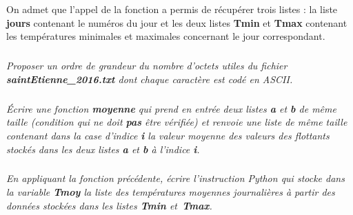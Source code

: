\documentclass[10pt,fleqn]{article} %
\begin{document}
%
%
%

On admet que l'appel de la fonction a permis de récupérer trois listes : la liste \textbf{jours}
contenant le numéros du jour et  les deux listes \textbf{Tmin} et 
\textbf{Tmax} contenant les températures minimales et maximales concernant le jour 
correspondant.


\subparagraph{} 
\textit{Proposer un ordre de grandeur du nombre d'octets utiles du fichier 
\textbf{saintEtienne\_2016.txt} dont chaque caractère est codé en ASCII.}

\ifprof
\begin{corrige}
\end{corrige}
\else
\fi
	
\subparagraph{} 
	\textit{Écrire une fonction \textbf{moyenne} qui prend en entrée deux listes 
	\textbf{a} et \textbf{b} de même taille (condition qui ne doit \textbf{pas} être vérifiée)
	 et renvoie une liste de même taille contenant dans 
	la case d'indice \textbf{i} la valeur moyenne des valeurs des flottants 
	stockés dans les deux listes \textbf{a} et \textbf{b} à l'indice \textbf{i}.}
	
\ifprof
\begin{corrige}
\end{corrige}
\else
\fi
	
\subparagraph{} 
\textit{En appliquant la fonction précédente, écrire l'instruction Python 
	qui stocke dans la variable \textbf{Tmoy} la liste des températures moyennes 
	journalières à partir des données stockées dans les listes \textbf{Tmin} et~\textbf{Tmax}.}
	
\end{document}
